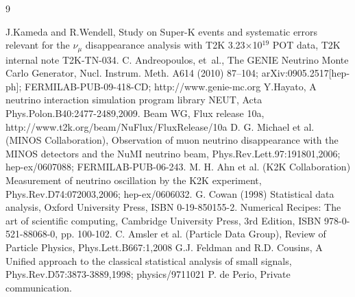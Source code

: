 \documentclass[final]{elsarticle}
\begin{document}







%


%
%
\clearpage
\appendix
\addappheadtotoc

\clearpage



\clearpage

%
%

\begin{thebibliography}{9}

  J.Kameda and R.Wendell,
  Study on Super-K events and systematic errors relevant for the $\nu_\mu$
  disappearance analysis with T2K 3.23$\times$10$^{19}$ POT data,
  T2K internal note T2K-TN-034.
%
%
  C. Andreopoulos, et~al., {The GENIE Neutrino Monte Carlo Generator}, 
  Nucl. Instrum. Meth. A614 (2010) 87--104;
  arXiv:0905.2517[hep-ph];
  FERMILAB-PUB-09-418-CD; http://www.genie-mc.org
%
%
  Y.Hayato, A neutrino interaction simulation program library NEUT,
  Acta Phys.Polon.B40:2477-2489,2009.
%
%
  Beam WG, Flux release 10a, http://www.t2k.org/beam/NuFlux/FluxRelease/10a
%
%
  D. G. Michael et al. (MINOS Collaboration), 
  Observation of muon neutrino disappearance with the MINOS detectors and the NuMI neutrino beam,
  Phys.Rev.Lett.97:191801,2006;
  hep-ex/0607088;
  FERMILAB-PUB-06-243.
  M. H. Ahn et al. (K2K Collaboration)
  Measurement of neutrino oscillation by the K2K experiment, 
  Phys.Rev.D74:072003,2006;
  hep-ex/0606032.
%
%
  G. Cowan (1998) Statistical data analysis, 
  Oxford University Press, ISBN 0-19-850155-2.
  Numerical Recipes: The art of scientific computing, 
  Cambridge University Press, 3rd Edition, ISBN 978-0-521-88068-0, pp. 100-102.
  C. Amsler et al. (Particle Data Group),
  Review of Particle Physics, Phys.Lett.B667:1,2008 
  G.J. Feldman and R.D. Cousins,
  A Unified approach to the classical statistical analysis of small signals,
  Phys.Rev.D57:3873-3889,1998; physics/9711021
%
%
  P. de Perio, Private communication.

\end{thebibliography}
\end{document}
